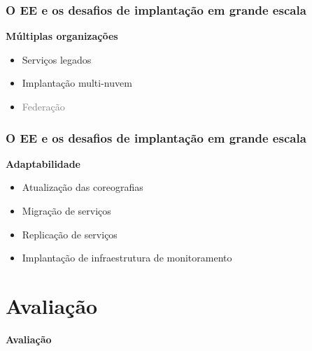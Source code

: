 \documentclass{beamer}
\newcommand\sectiontitle[1]{\begin{center}\huge\textbf{#1}\end{center}}
\newcommand\subtitulo[1]{{\large \textbf{#1}}}
\begin{document}

\begin{frame}
\frametitle{O EE e os desafios de implantação em grande escala}

\subtitulo{Múltiplas organizações}

\begin{itemize}
\item Serviços legados
\item Implantação multi-nuvem
\item \textcolor{gray}{Federação}
\end{itemize}

\end{frame}



\begin{frame}
\frametitle{O EE e os desafios de implantação em grande escala}

\subtitulo{Adaptabilidade}

\begin{itemize}
\item Atualização das coreografias
\item Migração de serviços
\item Replicação de serviços
\item Implantação de infraestrutura de monitoramento
\end{itemize}

\end{frame}



\section{Avaliação}

\begin{frame}

\sectiontitle{Avaliação}

\end{frame}

\end{document}

